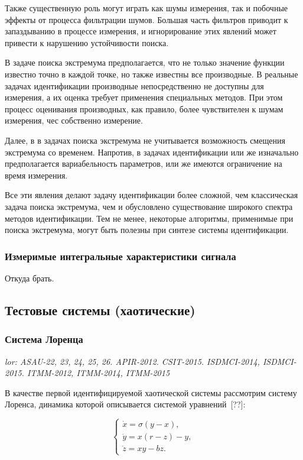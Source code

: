 \documentclass[a4paper,12pt]{article}
\newcommand{\LinkRef}[1]{ \textit{#1} }
\begin{document}
Также существенную роль могут играть как шумы измерения, так и побочные
эффекты от процесса фильтрации шумов. Большая часть фильтров приводит к запаздыванию
в процессе измерения, и игнорирование этих явлений может привести
к нарушению устойчивости поиска.

В задаче поиска экстремума предполагается, что не только
значение функции известно точно в каждой точке, но также известны все производные.
В реальные задачах идентификации производные непосредственно
не доступны для измерения, а их оценка требует применения специальных
методов. При этом процесс оценивания производных, как правило,
более чувствителен к шумам измерения, чес собственно измерение.

Далее, в в задачах поиска экстремума не учитывается возможность
смещения экстремума со временем. Напротив, в задачах идентификации
или же изначально предполагается вариабельность параметров, или же
имеются ограничение на время измерения.


Все эти явления делают задачу идентификации более сложной, чем
классическая задача поиска экстремума, чем и обусловлено
существование широкого спектра методов идентификации. Тем не менее,
некоторые алгоритмы, применимые при поиска экстремума, могут быть
полезны при синтезе системы идентификации.






\subsubsection{Измеримые интегральные характеристики сигнала}

Откуда брать.


\subsection{Тестовые системы (хаотические)}

\subsubsection{Система Лоренца} %

\LinkRef{
  lor: ASAU-22, 23, 24, 25, 26. APIR-2012. CSIT-2015. ISDMCI-2014, ISDMCI-2015.
  ITMM-2012, ITMM-2014, ITMM-2015
}

В качестве первой идентифицируемой хаотической системы рассмотрим
систему Лоренса, динамика которой описывается системой уравнений~[??]:

\begin{equation}
\begin{cases}
  \dot{x} = \sigma (y-x ) , \\
  \dot{y} = x (r-z) - y , \\
  \dot{z} = x y - b z .
\end{cases}
\label{atu:eq:lor}
\end{equation}
\end{document}

